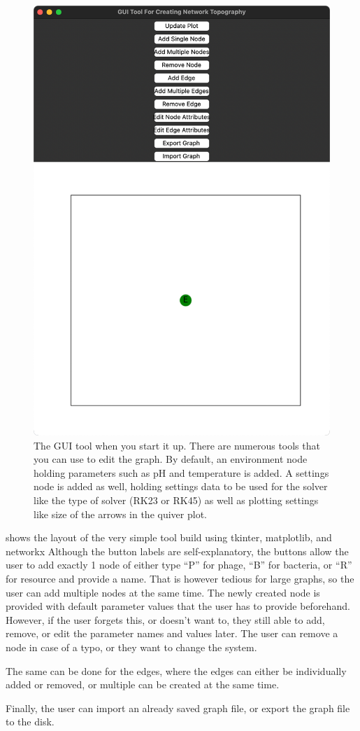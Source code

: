 \begin{figure}
    \centering
    \includegraphics[width=0.5\linewidth]{Chapters/Screenshots/initial_startup_GUI_tool.png}
    \caption{The GUI tool when you start it up. There are numerous tools that you can use to edit the graph. By default, an environment node holding parameters such as pH and temperature is added. A settings node is added as well, holding settings data to be used for the solver like the type of solver (RK23 or RK45) as well as plotting settings like size of the arrows in the quiver plot. }
    \label{fig:ss:initial_startup_GUI_tool}
\end{figure}
 shows the layout of the very simple tool build using tkinter, matplotlib, and networkx %
Although the button labels are self-explanatory, the buttons allow the user to add exactly 1 node of either type “P” for phage, “B” for bacteria, or “R” for resource and provide a name. 
That is however tedious for large graphs, so the user can add multiple nodes at the same time. 
The newly created node is provided with default parameter values that the user has to provide beforehand. 
However, if the user forgets this, or doesn't want to, they still able to add, remove, or edit the parameter names and values later. 
The user can remove a node in case of a typo, or they want to change the system. 

The same can be done for the edges, where the edges can either be individually added or removed, or multiple can be created at the same time. 

Finally, the user can import an already saved graph file, or export the graph file to the disk. 


